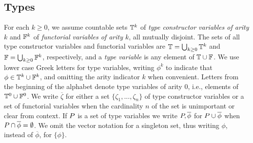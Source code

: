 \documentclass[runningheads]{llncs}
\newcommand{\F}{\mathcal{F}}
\begin{document}
\subsection{Types}
For each $k \ge 0$, we assume countable sets $\mathbb{T}^k$ of \emph{type
  constructor variables of arity $k$} and $\mathbb{F}^k$ of
\emph{functorial variables of arity $k$}, all mutually disjoint.
The sets of all type constructor variables and functorial variables
are $\mathbb{T} = \bigcup_{k \ge 0} \mathbb{T}^k$ and $\mathbb{F} = \bigcup_{k \ge
  0} \mathbb{F}^k$, respectively, and a \emph{type variable} is any
element of $\mathbb{T} \cup \mathbb{F}$.  We use lower case Greek letters for
type variables, writing $\phi^k$ to indicate that $\phi \in \mathbb{T}^k
\cup \mathbb{F}^k$, and omitting the arity indicator $k$ when convenient.
Letters from the beginning of the alphabet denote type variables of
arity $0$, i.e., elements of $\mathbb{T}^0 \cup \mathbb{F}^0$. We write
$\overline{\zeta}$ for either a set $\{\zeta_1,...,\zeta_n\}$ of type
constructor variables or a set of functorial variables when the
cardinality $n$ of the set is unimportant or clear from context. If
$P\!\,$ is a set of type variables we write $P\!, \overline{\phi}$
for $P\!\, \cup \overline{\phi}$ when $P\!\, \cap \overline{\phi} =
\emptyset$.  We omit the vector notation for a singleton set, thus
writing $\phi$, instead of $\overline{\phi}$, for $\{\phi\}$.

\end{document}
